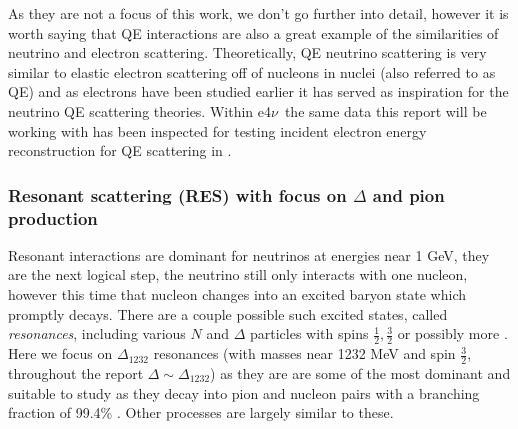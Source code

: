 \documentclass[a4paper,12pt]{article}
\newcommand{\efn}{e4$\nu$}
\begin{document}
As they are not a focus of this work, we don't go further into detail, however it is worth saying that QE interactions are also a great example of the similarities of neutrino and electron scattering.
Theoretically, QE neutrino scattering is very similar to elastic electron scattering off of nucleons in nuclei (also referred to as QE) and as electrons have been studied earlier it has served as inspiration for the neutrino QE scattering theories.
Within \efn\ the same data this report will be working with has been inspected for testing incident electron energy reconstruction for QE scattering in \cite{khachatryanElectronbeamEnergyReconstruction2021}.

\subsubsection{Resonant scattering (RES) with focus on $\Delta$ and pion production}
Resonant interactions are dominant for neutrinos at energies near 1 \si{GeV}, they are the next logical step, the neutrino still only interacts with one nucleon, however this time that nucleon changes into an excited baryon state which promptly decays.
There are a couple possible such excited states, called \emph{resonances}, including various $N$ and $\Delta$ particles with spins $\frac{1}{2}, \frac{3}{2}$ or possibly more \cite{leitnerElectronNeutrinonucleusScattering2009}.
Here we focus on $\Delta_{1232}$ resonances (with masses near 1232 \si{MeV} and spin $\frac{3}{2}$, throughout the report $\Delta \sim \Delta_{1232}$) as they are are some of the most dominant and suitable to study as they decay into pion and nucleon pairs with a branching fraction of 99.4\% \cite{particledatagroupReviewParticlePhysics2022}.
Other processes are largely similar to these.
\end{document}
